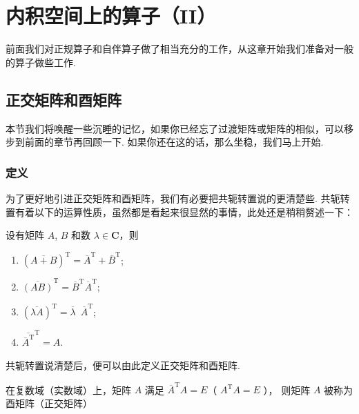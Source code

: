 \chapter{内积空间上的算子（II）}

前面我们对正规算子和自伴算子做了相当充分的工作，从这章开始我们准备对一般的算子做些工作. 

\section{正交矩阵和酉矩阵}

本节我们将唤醒一些沉睡的记忆，如果你已经忘了过渡矩阵或矩阵的相似，可以移步到前面的章节再回顾一下. 如果你还在这的话，那么坐稳，我们马上开始. 

\vspace{2ex}

\subsection{定义}

为了更好地引进正交矩阵和酉矩阵，我们有必要把共轭转置说的更清楚些. 
共轭转置有着以下的运算性质，虽然都是看起来很显然的事情，此处还是稍稍赘述一下：

设有矩阵 $ A $, $ B $ 和数 $ \lambda \in \mathbf{C}$，则

\begin{enumerate}    
    \item $ (\overline{A + B})^{\mathrm{T}} = \overline{A}^{\mathrm{T}} + \overline{B}^{\mathrm{T}} $;
    
    \item $ \overline{(AB)}^{\mathrm{T}} = \overline{B}^{\mathrm{T}} \overline{A}^{\mathrm{T}} $;
    
    \item $ (\overline{\lambda A})^{\mathrm{T}} = \overline{\lambda} \enspace \overline{A}^{\mathrm{T}} $;
    
    \item $ \overline{\overline{A}^{\mathrm{T}}}^{\mathrm{T}} = A $. 
\end{enumerate}

共轭转置说清楚后，便可以由此定义正交矩阵和酉矩阵. 

\begin{definition}   
    在复数域（实数域）上，矩阵 $ A $ 满足 $ \overline{A}^{\mathrm{T}} A = E $（ $ {A}^{\mathrm{T}} A = E $ ），
    则矩阵 $ A $ 被称为酉矩阵（正交矩阵） 
\end{definition}

